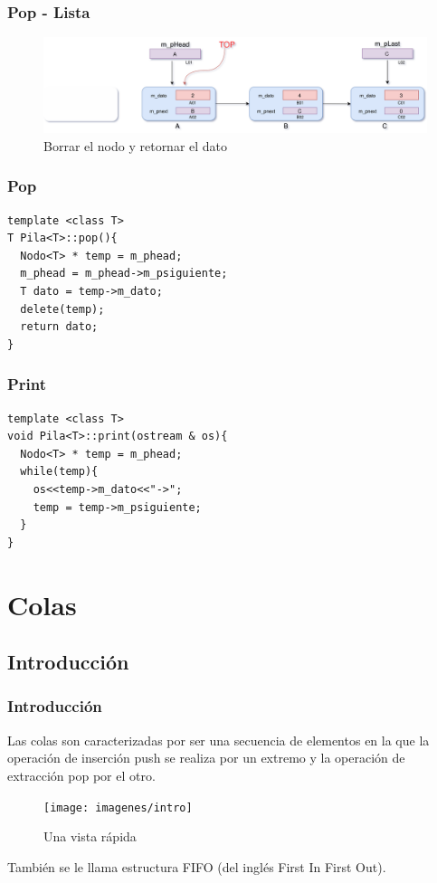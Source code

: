 \documentclass{beamer}
\begin{document}
\begin{frame}
    \frametitle{Pop - Lista}
    
    \begin{figure}
    \includegraphics[width =1 \textwidth]{images/pop03}
    \caption{Borrar el nodo y retornar el dato}
    \end{figure}
       
\end{frame}

\begin{frame}[fragile]  
\frametitle{Pop}
\begin{verbatim}
template <class T>
T Pila<T>::pop(){
  Nodo<T> * temp = m_phead;
  m_phead = m_phead->m_psiguiente;
  T dato = temp->m_dato;
  delete(temp);
  return dato;
}

\end{verbatim}
\end{frame}  


\begin{frame}[fragile]
\frametitle{Print}
\begin{verbatim}
template <class T>
void Pila<T>::print(ostream & os){
  Nodo<T> * temp = m_phead;
  while(temp){
    os<<temp->m_dato<<"->";
    temp = temp->m_psiguiente;
  }
}
\end{verbatim}
\end{frame}  



\section {Colas}
\subsection{Introducción}

\begin{frame}
    \frametitle{Introducción}
    Las colas son caracterizadas por ser una secuencia de elementos en la que la operación de inserción push se realiza por un extremo y la operación de extracción pop por el otro.
    \begin{figure}
    \texttt{[image: imagenes/intro]}
    \caption{Una vista rápida}
    \end{figure}
       También se le llama estructura FIFO (del inglés First In First Out).
\end{frame}
\end{document}
